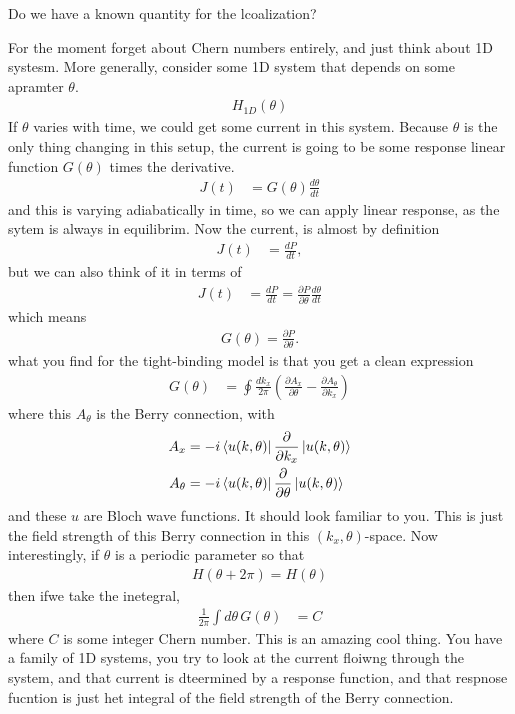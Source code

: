 \begin{question}
    Do we have a known quantity for the lcoalization?
\end{question}
For the moment forget about Chern numbers entirely,
and just think about 1D systesm.
More generally,
consider some 1D system that depends on some apramter $\theta$.
\begin{align}
    H_{1D}(\theta)
\end{align}
If $\theta$ varies with time,
we could get some current in this system.
Because $\theta$ is the only thing changing in this setup,
the current is going to be some response linear function $G(\theta)$ times the
derivative.
\begin{align}
    J(t) &= G(\theta) \frac{d\theta}{dt}
\end{align}
and this is varying adiabatically in time,
so we can apply linear response,
as the sytem is always in equilibrim.
Now the current,
is almost by definition
\begin{align}
    J(t) &= \frac{dP}{dt},
\end{align}
but we can also think of it in terms of
\begin{align}
    J(t) &= \frac{dP}{dt}
    = \frac{\partial P}{\partial \theta} \frac{d\theta}{dt}
\end{align}
which means
\begin{align}
    G(\theta) = \frac{\partial P}{\partial \theta}.
\end{align}
what you find for the tight-binding model is that you get a clean expression
\begin{align}
    G(\theta) &=
    \oint \frac{dk_x}{2\pi}\left( 
    \frac{\partial A_x}{\partial \theta} - \frac{\partial A_\theta}{\partial k_x}
    \right)
\end{align}
where this $A_\theta$ is the Berry connection,
with
\begin{align}
    A_x &=
    -i \bra{u(k,\theta)} \frac{\partial}{\partial k_x}
    \ket{u(k,\theta)}\\
    A_\theta &=
    -i \bra{u(k,\theta)} \frac{\partial}{\partial \theta}
    \ket{u(k,\theta)}\\
\end{align}
and these $u$ are Bloch wave functions.
It should look familiar to you.
This is just the field strength of this Berry connection in this
$(k_x,\theta)$-space.
Now interestingly,
if $\theta$ is a periodic parameter so that
\begin{align}
    H(\theta + 2\pi) = H(\theta)
\end{align}
then ifwe take the inetegral,
\begin{align}
    \frac{1}{2\pi}\int d\theta\, G(\theta) &=
    C
\end{align}
where $C$ is some integer Chern number.
This is an amazing cool thing.
You have a family of 1D systems,
you try to look at the current floiwng through the system,
and that current is dteermined by a response function,
and that respnose fucntion
is just het integral of the field strength of the Berry connection.


